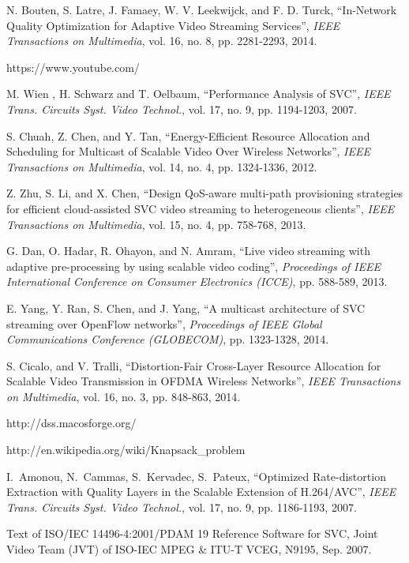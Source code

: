 \documentclass[journal]{IEEEtran}
\begin{document}
\begin{thebibliography}{1}
N. Bouten, S. Latre, J. Famaey, W. V. Leekwijck, and F. D. Turck, ``In-Network Quality Optimization for Adaptive Video Streaming Services'', {\em IEEE Transactions on Multimedia}, vol. 16, no. 8, pp. 2281-2293, 2014.

https://www.youtube.com/

M. Wien , H. Schwarz and T. Oelbaum,  ``Performance Analysis of SVC'', {\em IEEE Trans. Circuits Syst. Video Technol.}, vol. 17, no. 9, pp. 1194-1203, 2007.

S. Chuah, Z. Chen, and Y. Tan, ``Energy-Efficient Resource Allocation and Scheduling for Multicast of Scalable Video Over Wireless Networks'', {\em IEEE Transactions on Multimedia}, vol. 14, no. 4, pp. 1324-1336, 2012.

Z. Zhu, S. Li, and X. Chen, ``Design QoS-aware multi-path provisioning strategies for efficient cloud-assisted SVC video streaming to heterogeneous clients'', {\em IEEE Transactions on Multimedia}, vol. 15, no. 4, pp. 758-768, 2013.

G. Dan, O. Hadar, R. Ohayon, and N. Amram, ``Live video streaming with adaptive pre-processing by using scalable video coding'', {\em Proceedings of IEEE International Conference on Consumer Electronics (ICCE)}, pp. 588-589, 2013.

E. Yang, Y. Ran, S. Chen, and J. Yang, ``A multicast architecture of SVC streaming over OpenFlow networks'', {\em Proceedings of IEEE Global Communications Conference (GLOBECOM)}, pp. 1323-1328, 2014.

S. Cicalo, and V. Tralli, ``Distortion-Fair Cross-Layer Resource Allocation for Scalable Video Transmission in OFDMA Wireless Networks'', {\em IEEE Transactions on Multimedia}, vol. 16, no. 3, pp. 848-863, 2014.

http://dss.macosforge.org/

http://en.wikipedia.org/wiki/Knapsack\_problem

I.~Amonou, N.~Cammas, S.~Kervadec, S.~Pateux, ``Optimized Rate-distortion Extraction with Quality Layers in the Scalable Extension of H.264/AVC'', {\em IEEE Trans. Circuits Syst. Video Technol.}, vol. 17, no. 9, pp. 1186-1193, 2007.

Text of ISO/IEC 14496-4:2001/PDAM 19 Reference Software for SVC, Joint Video Team (JVT) of ISO-IEC MPEG \& ITU-T VCEG, N9195, Sep. 2007.


\end{thebibliography}
\end{document}
